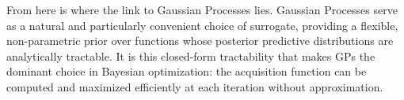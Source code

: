From here is where the link to Gaussian Processes lies. Gaussian Processes serve as a natural and particularly convenient choice of surrogate, providing a flexible, non-parametric prior  over functions whose posterior predictive distributions are analytically tractable. It is this closed-form tractability that makes GPs the dominant choice in Bayesian optimization: the acquisition function can be computed and maximized efficiently at each iteration without approximation.



















